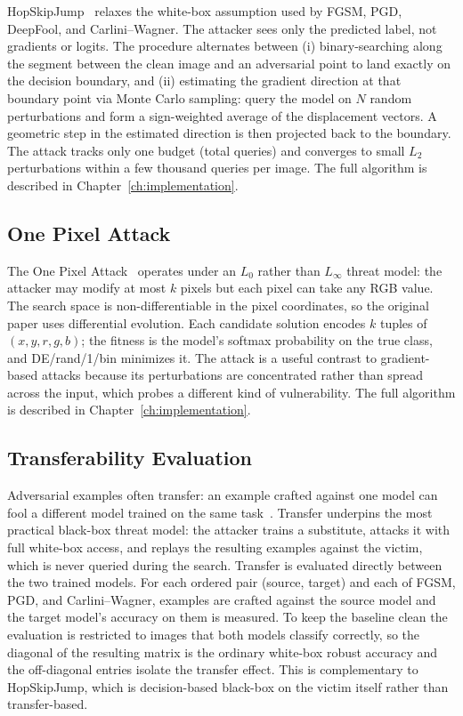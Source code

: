 HopSkipJump~\cite{chen2020hopskipjump} relaxes the white-box assumption used by FGSM, PGD, DeepFool, and Carlini--Wagner. The attacker sees only the predicted label, not gradients or logits. The procedure alternates between (i) binary-searching along the segment between the clean image and an adversarial point to land exactly on the decision boundary, and (ii) estimating the gradient direction at that boundary point via Monte Carlo sampling: query the model on $N$ random perturbations and form a sign-weighted average of the displacement vectors. A geometric step in the estimated direction is then projected back to the boundary. The attack tracks only one budget (total queries) and converges to small $L_2$ perturbations within a few thousand queries per image. The full algorithm is described in Chapter~\ref{ch:implementation}.

\subsection{One Pixel Attack}

The One Pixel Attack~\cite{su2019onepixel} operates under an $L_0$ rather than $L_\infty$ threat model: the attacker may modify at most $k$ pixels but each pixel can take any RGB value. The search space is non-differentiable in the pixel coordinates, so the original paper uses differential evolution. Each candidate solution encodes $k$ tuples of $(x, y, r, g, b)$; the fitness is the model's softmax probability on the true class, and DE/rand/1/bin minimizes it. The attack is a useful contrast to gradient-based attacks because its perturbations are concentrated rather than spread across the input, which probes a different kind of vulnerability. The full algorithm is described in Chapter~\ref{ch:implementation}.

\subsection{Transferability Evaluation}

Adversarial examples often transfer: an example crafted against one model can fool a different model trained on the same task~\cite{papernot2017practical}. Transfer underpins the most practical black-box threat model: the attacker trains a substitute, attacks it with full white-box access, and replays the resulting examples against the victim, which is never queried during the search. Transfer is evaluated directly between the two trained models. For each ordered pair (source, target) and each of FGSM, PGD, and Carlini--Wagner, examples are crafted against the source model and the target model's accuracy on them is measured. To keep the baseline clean the evaluation is restricted to images that both models classify correctly, so the diagonal of the resulting matrix is the ordinary white-box robust accuracy and the off-diagonal entries isolate the transfer effect. This is complementary to HopSkipJump, which is decision-based black-box on the victim itself rather than transfer-based.


